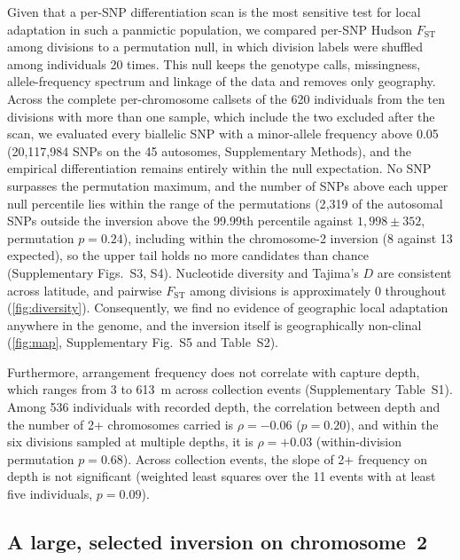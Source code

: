 \documentclass[11pt]{article}
\newcommand{\Fst}{F_\mathrm{ST}}
\begin{document}
Given that a per-SNP differentiation scan is the most sensitive test for local adaptation in such a panmictic population, we compared per-SNP Hudson $\Fst$ among divisions \citep{bhatia2013} to a permutation null, in which division labels were shuffled among individuals 20 times. This null keeps the genotype calls, missingness, allele-frequency spectrum and linkage of the data and removes only geography. Across the complete per-chromosome callsets of the 620 individuals from the ten divisions with more than one sample, which include the two excluded after the scan, we evaluated every biallelic SNP with a minor-allele frequency above 0.05 (20{,}117{,}984 SNPs on the 45 autosomes, Supplementary Methods), and the empirical differentiation remains entirely within the null expectation. No SNP surpasses the permutation maximum, and the number of SNPs above each upper null percentile lies within the range of the permutations (2{,}319 of the autosomal SNPs outside the inversion above the 99.99th percentile against $1{,}998\pm352$, permutation $p=0.24$), including within the chromosome-2 inversion (8 against 13 expected), so the upper tail holds no more candidates than chance (Supplementary Figs.~S3, S4). Nucleotide diversity and Tajima's $D$ are consistent across latitude, and pairwise $\Fst$ among divisions is approximately 0 throughout (\cref{fig:diversity}). Consequently, we find no evidence of geographic local adaptation anywhere in the genome, and the inversion itself is geographically non-clinal (\cref{fig:map}, Supplementary Fig.~S5 and Table~S2).

Furthermore, arrangement frequency does not correlate with capture depth, which ranges from 3 to 613~m across collection events (Supplementary Table~S1). Among 536 individuals with recorded depth, the correlation between depth and the number of 2+ chromosomes carried is $\rho=-0.06$ ($p=0.20$), and within the six divisions sampled at multiple depths, it is $\rho=+0.03$ (within-division permutation $p=0.68$). Across collection events, the slope of 2+ frequency on depth is not significant (weighted least squares over the 11 events with at least five individuals, $p=0.09$).

\subsection{A large, selected inversion on chromosome~2}\label{sec:inv}
\end{document}
